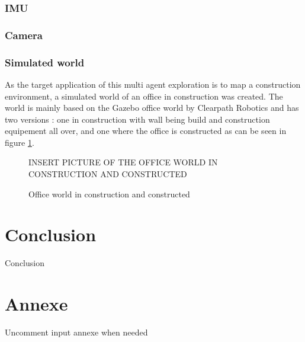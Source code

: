 \documentclass[11pt]{article}
\begin{document}
        \subsubsection{IMU}
        \subsubsection{Camera}
    \subsubsection{Simulated world}

    As the target application of this multi agent exploration is to map a construction environment, a simulated world of an office in construction was created. The world is mainly based on the Gazebo office world by Clearpath Robotics and has two versions : one in construction with wall being build and construction equipement all over, and one where the office is constructed as can be seen in figure \ref{fig:office_world}.

    \begin{figure}
        \centering
        \color{red} INSERT PICTURE OF THE OFFICE WORLD IN CONSTRUCTION AND CONSTRUCTED
        \caption{Office world in construction and constructed}
        \label{fig:office_world}
    \end{figure}


\section{Conclusion}

    Conclusion     

\newpage

\newpage
{}
\printnoidxglossaries %

\newpage
{}
\listoffigures


\newpage
\section*{Annexe}
Uncomment input annexe when needed
%



    
\end{document}
